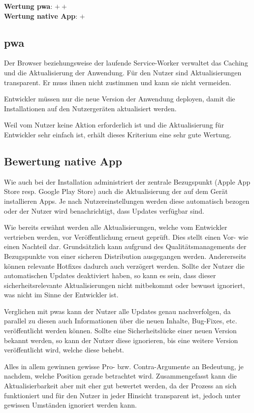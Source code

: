 \textbf{Wertung \ac{pwa}}: $++$ \\
\textbf{Wertung native App}: $+$ \\

\subsection{\ac{pwa}}
Der Browser beziehungsweise der laufende Service-Worker verwaltet das Caching und die Aktualisierung der Anwendung. Für den Nutzer sind Aktualisierungen transparent. Er muss ihnen nicht zustimmen und kann sie nicht vermeiden. 

Entwickler müssen nur die neue Version der Anwendung deployen, damit die Installationen auf den Nutzergeräten aktualisiert werden.

Weil vom Nutzer keine Aktion erforderlich ist und die Aktualisierung für Entwickler sehr einfach ist, erhält dieses Kriterium eine sehr gute Wertung.

\subsection{Bewertung native App}
Wie auch bei der Installation administriert der zentrale Bezugspunkt (Apple App Store resp. Google Play Store) auch die Aktualisierung der auf dem Gerät installieren Apps. Je nach Nutzereinstellungen werden diese automatisch bezogen oder der Nutzer wird benachrichtigt, dass Updates verfügbar sind.

Wie bereits erwähnt werden alle Aktualisierungen, welche vom Entwickler vertrieben werden, vor Veröffentlichung erneut geprüft. Dies stellt einen Vor- wie einen Nachteil dar. Grundsätzlich kann aufgrund des Qualitätsmanagements der Bezugspunkte von einer sicheren Distribution ausgegangen werden. Andererseits können relevante Hotfixes dadurch auch verzögert werden. Sollte der Nutzer die automatischen Updates deaktiviert haben, so kann es sein, dass dieser sicherheitsrelevante Aktualisierungen nicht mitbekommt oder bewusst ignoriert, was nicht im Sinne der Entwickler ist.

Verglichen mit \acp{pwa} kann der Nutzer alle Updates genau nachverfolgen, da parallel zu diesen auch Informationen über die neuen Inhalte, Bug-Fixes, etc. veröffentlicht werden können. Sollte eine Sicherheitslücke einer neuen Version bekannt werden, so kann der Nutzer diese ignorieren, bis eine weitere Version veröffentlicht wird, welche diese behebt.

Alles in allem gewinnen gewisse Pro- bzw. Contra-Argumente an Bedeutung, je nachdem, welche Position gerade betrachtet wird. Zusammengefasst kann die Aktualisierbarkeit aber mit eher gut bewertet werden, da der Prozess an sich funktioniert und für den Nutzer in jeder Hinsicht transparent ist, jedoch unter gewissen Umständen ignoriert werden kann.